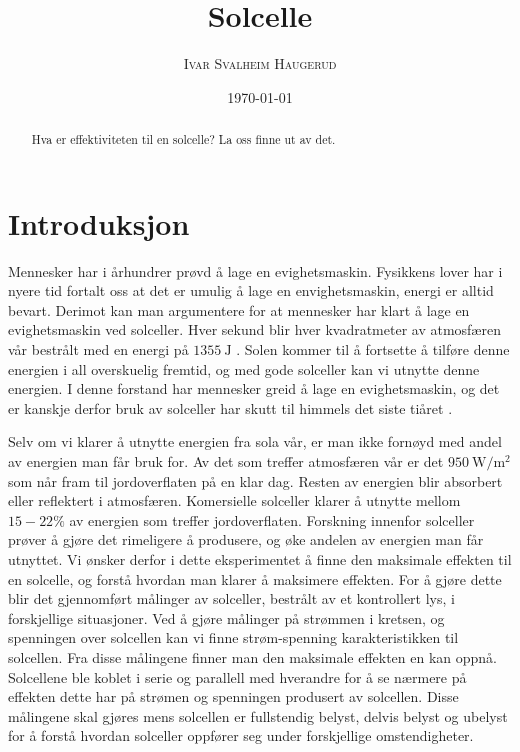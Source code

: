 \documentclass[%
 reprint,
 amsmath,amssymb,
 aps,
 norsk,
 booktabs
]{revtex4-1}
\begin{document}
\title{Solcelle}
\author{\textsc{Ivar Svalheim Haugerud}}
\date{\today}

\begin{abstract}
Hva er effektiviteten til en solcelle? La oss finne ut av det.
\end{abstract}

\maketitle

\section{Introduksjon}
Mennesker har i århundrer prøvd å lage en evighetsmaskin. Fysikkens lover har i nyere tid fortalt oss at det er umulig å lage en envighetsmaskin, energi er alltid bevart. Derimot kan man argumentere for at mennesker har klart å lage en evighetsmaskin ved solceller. Hver sekund blir hver kvadratmeter av atmosfæren vår bestrålt med en energi på $\SI{1355}{\joule}$ \cite{oppgave}. Solen kommer til å fortsette å tilføre denne energien i all overskuelig fremtid, og med gode solceller kan vi utnytte denne energien. I denne forstand har mennesker greid å lage en evighetsmaskin, og det er kanskje derfor bruk av solceller har skutt til himmels det siste tiåret \cite{oppgave}.\par
Selv om vi klarer å utnytte energien fra sola vår, er man ikke fornøyd med andel av energien man får bruk for. Av det som treffer atmosfæren vår er det $\SI{950}{\watt\per\meter^2}$ som når fram til jordoverflaten på en klar dag. Resten av energien blir absorbert eller reflektert i atmosfæren. Komersielle solceller klarer å utnytte mellom $15-22\%$ av energien som treffer jordoverflaten. Forskning innenfor solceller prøver å gjøre det rimeligere å produsere, og øke andelen av energien man får utnyttet. Vi ønsker derfor i dette eksperimentet å finne den maksimale effekten til en solcelle, og forstå hvordan man klarer å maksimere effekten. For å gjøre dette blir det gjennomført målinger av solceller, bestrålt av et kontrollert lys, i forskjellige situasjoner. Ved å gjøre målinger på strømmen i kretsen, og spenningen over solcellen kan vi finne strøm-spenning karakteristikken til solcellen. Fra disse målingene finner man den maksimale effekten en kan oppnå. Solcellene ble koblet i serie og parallell med hverandre for å se nærmere på effekten dette har på strømen og spenningen produsert av solcellen. Disse målingene skal gjøres mens solcellen er fullstendig belyst, delvis belyst og ubelyst for å forstå hvordan solceller oppfører seg under forskjellige omstendigheter.
\end{document}
